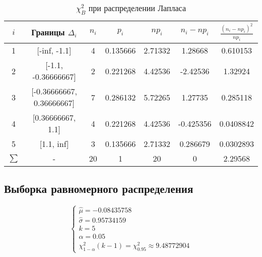 \documentclass[12pt,a4paper]{article}
\begin{document}
\begin{table}[H]
    \centering
    \begin{tabular}{|c|c|c|c|c|c|c|}
    \hline
    $i$ & Границы $\Delta_i$ & $n_i$ & $p_i$ & $np_i$ & $n_i-np_i$ & $\frac{(n_i-np_i)^2}{np_i}$ \\ \hline
    1 & [-inf, -1.1]              &  4 & 0.135666 &  2.71332 &  1.28668  & 0.610153  \\ \hline
    2 & [-1.1, -0.36666667]       &  2 & 0.221268 &  4.42536 & -2.42536  & 1.32924   \\ \hline
    3 & [-0.36666667, 0.36666667] &  7 & 0.286132 &  5.72265 &  1.27735  & 0.285118  \\ \hline
    4 & [0.36666667, 1.1]         &  4 & 0.221268 &  4.42536 & -0.425356 & 0.0408842 \\ \hline
    5 & [1.1, inf]                &  3 & 0.135666 &  2.71332 &  0.286679 & 0.0302893 \\ \hline
    $\sum$ & -                         & 20 & 1        & 20       &  0        & 2.29568   \\  \hline
    \end{tabular} 
    \caption{$\chi^2_B$ при распределении Лапласа}
\end{table}

\subsection{Выборка равномерного распределения}
\begin{equation}
    \left\{
    \begin{array}{ll}
        \hat{\mu} = -0.08435758\\
        \hat{\sigma} = 0.95734159\\
        k = 5\\
        \alpha = 0.05\\
        \chi^2_{1 - \alpha}(k - 1)=\chi^2_{0.95} \approx 9.48772904
    \end{array}
    \right.
\end{equation}
\end{document}
